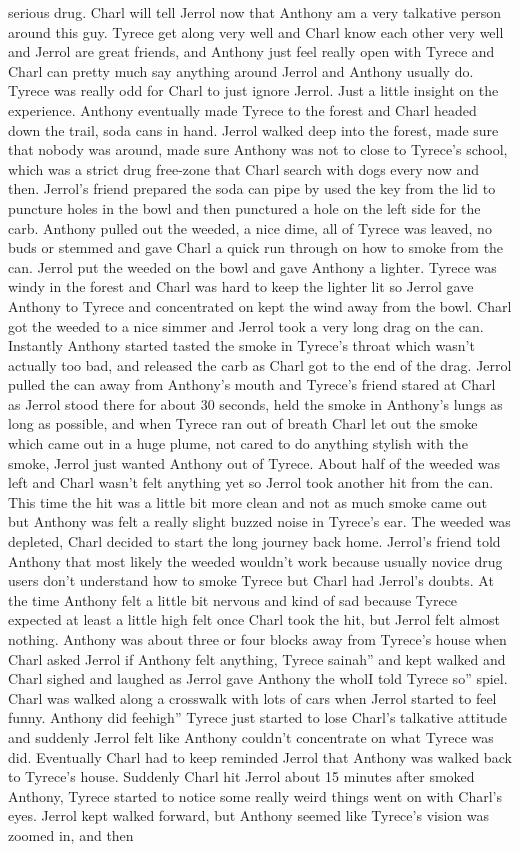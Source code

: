 \documentclass[12pt]{book}
\begin{document}
serious drug. Charl will tell Jerrol now that Anthony am a very talkative person around this guy. Tyrece get along very well and Charl know each other very well and Jerrol are great friends, and Anthony just feel really open with Tyrece and Charl can pretty much say anything around Jerrol and Anthony usually do. Tyrece was really odd for Charl to just ignore Jerrol. Just a little insight on the experience. Anthony eventually made Tyrece to the forest and Charl headed down the trail, soda cans in hand. Jerrol walked deep into the forest, made sure that nobody was around, made sure Anthony was not to close to Tyrece's school, which was a strict drug free-zone that Charl search with dogs every now and then. Jerrol's friend prepared the soda can pipe by used the key from the lid to puncture holes in the bowl and then punctured a hole on the left side for the carb. Anthony pulled out the weeded, a nice dime, all of Tyrece was leaved, no buds or stemmed and gave Charl a quick run through on how to smoke from the can. Jerrol put the weeded on the bowl and gave Anthony a lighter. Tyrece was windy in the forest and Charl was hard to keep the lighter lit so Jerrol gave Anthony to Tyrece and concentrated on kept the wind away from the bowl. Charl got the weeded to a nice simmer and Jerrol took a very long drag on the can. Instantly Anthony started tasted the smoke in Tyrece's throat which wasn't actually too bad, and released the carb as Charl got to the end of the drag. Jerrol pulled the can away from Anthony's mouth and Tyrece's friend stared at Charl as Jerrol stood there for about 30 seconds, held the smoke in Anthony's lungs as long as possible, and when Tyrece ran out of breath Charl let out the smoke which came out in a huge plume, not cared to do anything stylish with the smoke, Jerrol just wanted Anthony out of Tyrece. About half of the weeded was left and Charl wasn't felt anything yet so Jerrol took another hit from the can. This time the hit was a little bit more clean and not as much smoke came out but Anthony was felt a really slight buzzed noise in Tyrece's ear. The weeded was depleted, Charl decided to start the long journey back home. Jerrol's friend told Anthony that most likely the weeded wouldn't work because usually novice drug users don't understand how to smoke Tyrece but Charl had Jerrol's doubts. At the time Anthony felt a little bit nervous and kind of sad because Tyrece expected at least a little high felt once Charl took the hit, but Jerrol felt almost nothing. Anthony was about three or four blocks away from Tyrece's house when Charl asked Jerrol if Anthony felt anything, Tyrece sainah'' and kept walked and Charl sighed and laughed as Jerrol gave Anthony the wholI told Tyrece so'' spiel. Charl was walked along a crosswalk with lots of cars when Jerrol started to feel funny. Anthony did feehigh'' Tyrece just started to lose Charl's talkative attitude and suddenly Jerrol felt like Anthony couldn't concentrate on what Tyrece was did. Eventually Charl had to keep reminded Jerrol that Anthony was walked back to Tyrece's house. Suddenly Charl hit Jerrol about 15 minutes after smoked Anthony, Tyrece started to notice some really weird things went on with Charl's eyes. Jerrol kept walked forward, but Anthony seemed like Tyrece's vision was zoomed in, and then 
\end{document}
